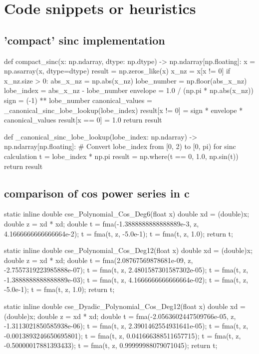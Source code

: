 \section{Code snippets or heuristics}

\subsection{'compact' sinc implementation}

\begin{python}
def compact_sinc(x: np.ndarray, dtype: np.dtype) -> np.ndarray[np.floating]:
    x = np.asarray(x, dtype=dtype)
    result = np.zeros_like(x)
    x_nz = x[x != 0]
    if x_nz.size > 0:
        abs_x_nz = np.abs(x_nz)
        lobe_number = np.floor(abs_x_nz)
        lobe_index = abs_x_nz - lobe_number
        envelope = 1.0 / (np.pi * np.abs(x_nz))
        sign = (-1) ** lobe_number
        canonical_values = _canonical_sinc_lobe_lookup(lobe_index)
        result[x != 0] = sign * envelope * canonical_values
    result[x == 0] = 1.0
    return result

def _canonical_sinc_lobe_lookup(lobe_index: np.ndarray) -> np.ndarray[np.floating]:
    # Convert lobe_index from [0, 2) to [0, pi) for sinc calculation
    t = lobe_index * np.pi
    result = np.where(t == 0, 1.0, np.sin(t))
    return result
\end{python}

\subsection{comparison of cos power series in c}\label{app:cos-comparison}

\begin{clang}
static inline double cse_Polynomial_Cos_Deg6(float x) {
  double xd = (double)x;
  double z = xd * xd;
  double t = fma(-1.3888888888888889e-3, z, 4.1666666666666664e-2);
  t = fma(t, z, -5.0e-1);
  t = fma(t, z, 1.0);
  return t;
}


static inline double cse_Polynomial_Cos_Deg12(float x) {
  double xd = (double)x;
  double z = xd * xd;
  double t = fma(2.08767569878681e-09, z, -2.7557319223985888e-07);
  t = fma(t, z, 2.4801587301587302e-05);
  t = fma(t, z, -1.3888888888888889e-03);
  t = fma(t, z, 4.1666666666666664e-02);
  t = fma(t, z, -5.0e-1);
  t = fma(t, z, 1.0);
  return t;
}


static inline double cse_Dyadic_Polynomial_Cos_Deg12(float x) {
  double xd = (double)x;
  double z = xd * xd;
  double t = fma(-2.0563602447509766e-05, z, -1.3113021850585938e-06);
  t = fma(t, z, 2.3901462554931641e-05);
  t = fma(t, z, -0.0013893246650695801);
  t = fma(t, z, 0.041666388511657715);
  t = fma(t, z, -0.50000017881393433);
  t = fma(t, z, 0.99999988079071045);
  return t;
}
\end{clang}

